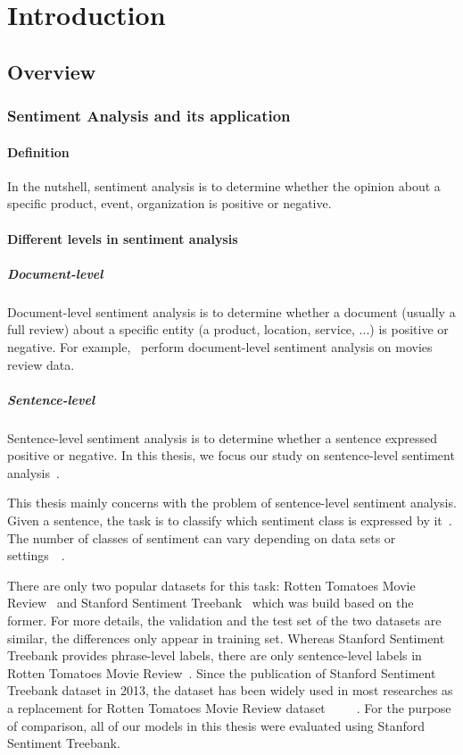 \hypertarget{chap:intro}{\chapter{Introduction}}
\section{Overview}
\subsection{Sentiment Analysis and its application}
\subsubsection{Definition}
In the nutshell, sentiment analysis is to determine whether the opinion about a specific product, event, organization is positive or negative.

\subsubsection{Different levels in sentiment analysis}
\paragraph{Document-level}
Document-level sentiment analysis is to determine whether a document (usually a full review) about a specific entity (a product, location, service, ...) is positive or negative. For example,~\cite{pang2002thumbs} perform document-level sentiment analysis on movies review data.
\paragraph{Sentence-level}\label{sec:sent-level}
Sentence-level sentiment analysis is to determine whether a sentence expressed positive or negative. 
In this thesis, we focus our study on sentence-level sentiment analysis~\cite{liu2012sentiment}.

This thesis mainly concerns with the problem of sentence-level sentiment analysis. 
Given a sentence, the task is to classify which sentiment class is expressed by it~\cite{liu2012sentiment}.
The number of classes of sentiment can vary depending on data sets or settings~\cite{Rotten-Tomato}~\cite{socher2013recursive}.

There are only two popular datasets for this task: Rotten Tomatoes Movie Review~\cite{Rotten-Tomato} and Stanford Sentiment Treebank~\cite{socher2013recursive} which was build based on the former.
For more details, the validation and the test set of the two datasets are similar, the differences only appear in training set.
Whereas Stanford Sentiment Treebank provides phrase-level labels, there are only sentence-level labels in Rotten Tomatoes Movie Review~\cite{socher2013recursive}.
Since the publication of Stanford Sentiment Treebank dataset in 2013, the dataset has been widely used in most researches as a replacement for Rotten Tomatoes Movie Review dataset~\cite{treeLSTM}~\cite{KimCNN}~\cite{cnn-rnn}~\cite{2-layer-cnn}~\cite{socher2013recursive}.
For the purpose of comparison, all of our models in this thesis were evaluated using Stanford Sentiment Treebank.

